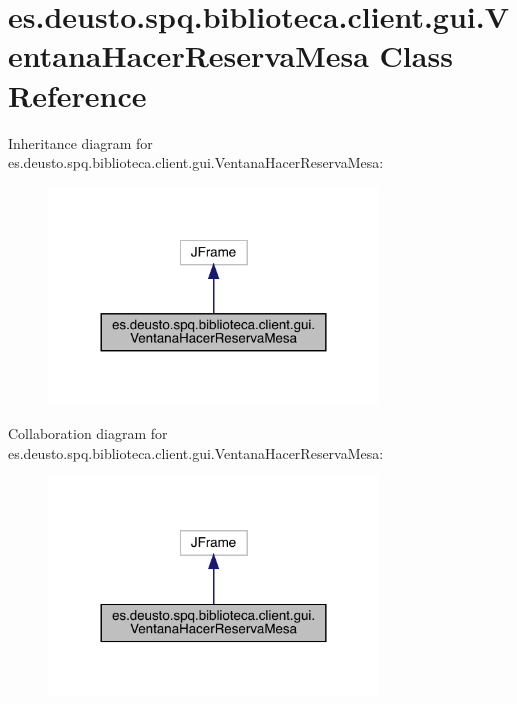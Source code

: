 \hypertarget{classes_1_1deusto_1_1spq_1_1biblioteca_1_1client_1_1gui_1_1_ventana_hacer_reserva_mesa}{}\section{es.\+deusto.\+spq.\+biblioteca.\+client.\+gui.\+Ventana\+Hacer\+Reserva\+Mesa Class Reference}
\label{classes_1_1deusto_1_1spq_1_1biblioteca_1_1client_1_1gui_1_1_ventana_hacer_reserva_mesa}


Inheritance diagram for es.\+deusto.\+spq.\+biblioteca.\+client.\+gui.\+Ventana\+Hacer\+Reserva\+Mesa\+:
\nopagebreak
\begin{figure}[H]
\begin{center}
\leavevmode
\includegraphics[width=248pt]{classes_1_1deusto_1_1spq_1_1biblioteca_1_1client_1_1gui_1_1_ventana_hacer_reserva_mesa__inherit__graph}
\end{center}
\end{figure}


Collaboration diagram for es.\+deusto.\+spq.\+biblioteca.\+client.\+gui.\+Ventana\+Hacer\+Reserva\+Mesa\+:
\nopagebreak
\begin{figure}[H]
\begin{center}
\leavevmode
\includegraphics[width=248pt]{classes_1_1deusto_1_1spq_1_1biblioteca_1_1client_1_1gui_1_1_ventana_hacer_reserva_mesa__coll__graph}
\end{center}
\end{figure}
